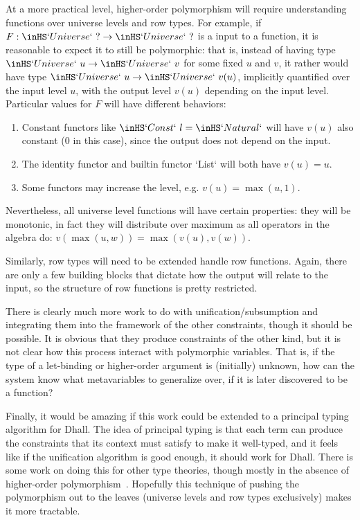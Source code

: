 \documentclass[11pt, twoside, reqno]{book}
\begin{document}
At a more practical level, higher-order polymorphism will require understanding functions over universe levels and row types.
For example, if \(F : \inHS`Universe`\ ? \to \inHS`Universe`\ ?\) is a input to a function, it is reasonable to expect it to still be polymorphic: that is, instead of having type \(\inHS`Universe`\ u \to \inHS`Universe`\ v\) for some fixed \(u\) and \(v\), it rather would have type \(\inHS`Universe`\ u \to \inHS`Universe`\ v(u)\), implicitly quantified over the input level \(u\), with the output level \(v(u)\) depending on the input level.
Particular values for \(F\) will have different behaviors:
\begin{enumerate}
\item Constant functors like \(\inHS`Const`\ l = \inHS`Natural`\) will have \(v(u)\) also constant (\(0\) in this case), since the output does not depend on the input.
\item The identity functor and builtin functor \inHS`List` will both have \(v(u) = u\).
\item Some functors may increase the level, e.g. \(v(u) = \max(u, 1)\).
\end{enumerate}
Nevertheless, all universe level functions will have certain properties: they will be monotonic, in fact they will distribute over maximum as all operators in the algebra do: \(v(\max(u,w)) = \max(v(u), v(w))\).

Similarly, row types will need to be extended handle row functions.
Again, there are only a few building blocks that dictate how the output will relate to the input, so the structure of row functions is pretty restricted.

There is clearly much more work to do with unification/subsumption and integrating them into the framework of the other constraints, though it should be possible.
It is obvious that they produce constraints of the other kind, but it is not clear how this process interact with polymorphic variables.
That is, if the type of a let-binding or higher-order argument is (initially) unknown, how can the system know what metavariables to generalize over, if it is later discovered to be a function?

Finally, it would be amazing if this work could be extended to a principal typing algorithm for Dhall.
The idea of principal typing is that each term can produce the constraints that its context must satisfy to make it well-typed, and it feels like if the unification algorithm is good enough, it should work for Dhall.
There is some work on doing this for other type theories, though mostly in the absence of higher-order polymorphism~\cite{10.1145/237721.237728}\cite{10.5555/646255.684409}.
Hopefully this technique of pushing the polymorphism out to the leaves (universe levels and row types exclusively) makes it more tractable.
\end{document}
